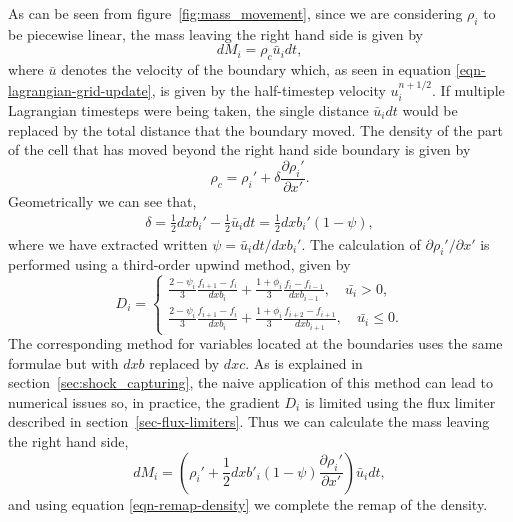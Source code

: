 As can be seen from figure~\ref{fig:mass_movement}, since we are considering $\rho_i$ to be piecewise linear, the mass leaving the right hand side is given by
\begin{equation}
  dM_i = \rho_c \bar{u}_i dt,
\end{equation}
where $\bar{u}$ denotes the velocity of the boundary which, as seen in equation \eqref{eqn-lagrangian-grid-update}, is given by the half-timestep velocity $u_i^{n+1/2}$. If multiple Lagrangian timesteps were being taken, the single distance $\bar{u}_i dt$ would be replaced by the total distance that the boundary moved. The density of the part of the cell that has moved beyond the right hand side boundary is given by
\begin{equation}
  \rho_c = \rho_i' + \delta \frac{\partial \rho_i'}{\partial x'}.
\end{equation}
Geometrically we can see that,
\begin{align}
  \delta =  \frac{1}{2} dxb_i' - \frac{1}{2} \bar{u}_i dt = \frac{1}{2} dxb_i'(1-\psi),
\end{align}
where we have extracted  written $\psi = \bar{u}_i dt / dxb_i'$. The calculation of $\partial\rho_i'/ \partial x'$ is performed using a third-order upwind method, given by
\begin{equation}
  \label{eq:upwind_method}
D_i = 
\begin{cases}
\frac{2-\psi_i}{3} \frac{f_{i+1} - f_i}{dxb_i} + \frac{1+\phi_i}{3}\frac{f_i - f_{i-1}}{dxb_{i-1}}, \quad \bar{u_i} > 0,\\
\frac{2-\psi_i}{3} \frac{f_{i+1} - f_i}{dxb_i} + \frac{1+\phi_i}{3}\frac{f_{i+2} - f_{i+1}}{dxb_{i+1}}, \quad \bar{u_i} \leq 0.
\end{cases}
\end{equation}
The corresponding method for variables located at the boundaries uses the same formulae but with $dxb$ replaced by $dxc$. As is explained in section~\ref{sec:shock_capturing}, the naive application of this method can lead to numerical issues so, in practice, the gradient $D_i$ is limited using the flux limiter described in section~\ref{sec-flux-limiters}. Thus we can calculate the mass leaving the right hand side, 
\begin{equation}
dM_i = \left( \rho_i' + \frac{1}{2}dxb'_i(1-\psi) \frac{\partial \rho_i'}{\partial x'} \right) \bar{u}_i dt,
\label{eqn-remap-mass-diff}
\end{equation} 
and using equation \eqref{eqn-remap-density} we complete the remap of the density.

